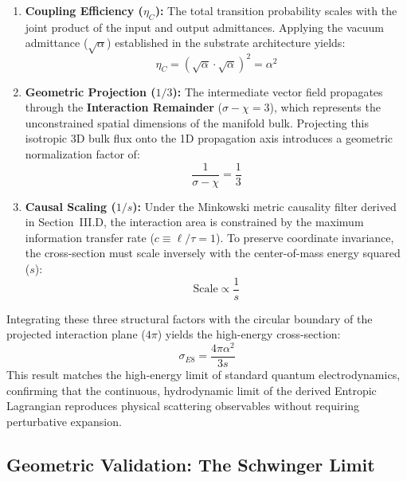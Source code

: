 \begin{enumerate}
    \item \textbf{Coupling Efficiency ($\eta_C$):} The total transition probability scales with the joint product of the input and output admittances. Applying the vacuum admittance ($\sqrt{\alpha}$) established in the substrate architecture yields: 
    \begin{equation}
        \eta_C = (\sqrt{\alpha} \cdot \sqrt{\alpha})^2 = \alpha^2
    \end{equation}
    
    \item \textbf{Geometric Projection ($1/3$):} The intermediate vector field propagates through the \textbf{Interaction Remainder} ($\sigma - \chi = 3$), which represents the unconstrained spatial dimensions of the manifold bulk. Projecting this isotropic 3D bulk flux onto the 1D propagation axis introduces a geometric normalization factor of:
    \begin{equation}
        \frac{1}{\sigma - \chi} = \frac{1}{3}
    \end{equation}
    
    \item \textbf{Causal Scaling ($1/s$):} Under the Minkowski metric causality filter derived in Section~III.D, the interaction area is constrained by the maximum information transfer rate ($c \equiv \ell/\tau = 1$). To preserve coordinate invariance, the cross-section must scale inversely with the center-of-mass energy squared ($s$):
    \begin{equation}
        \text{Scale} \propto \frac{1}{s}
    \end{equation}
\end{enumerate}

Integrating these three structural factors with the circular boundary of the projected interaction plane ($4\pi$) yields the high-energy cross-section:
\begin{equation}
\sigma_{E8} = \frac{4\pi \alpha^2}{3s}
\end{equation}
This result matches the high-energy limit of standard quantum electrodynamics, confirming that the continuous, hydrodynamic limit of the derived Entropic Lagrangian reproduces physical scattering observables without requiring perturbative expansion.

\subsection{Geometric Validation: The Schwinger Limit}

